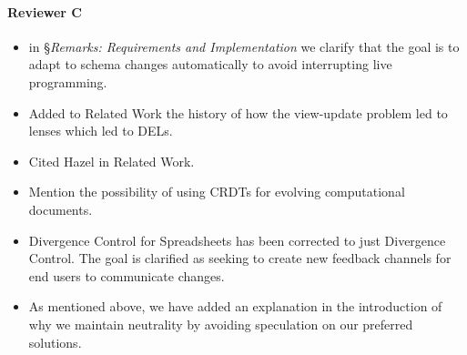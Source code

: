 \documentclass{article}
\begin{document}
\paragraph{Reviewer C}{}
\begin{itemize}
  \item in \S\emph{Remarks: Requirements and Implementation} we clarify that the goal is to adapt to schema changes automatically to avoid interrupting live programming.

  \item Added to Related Work the history of how the view-update problem led to lenses which led to DELs.

  \item Cited Hazel in Related Work.

  \item Mention the possibility of using CRDTs for evolving computational documents.

  \item Divergence Control for Spreadsheets has been corrected to just Divergence Control. The goal is clarified as seeking to create new feedback channels for end users to communicate changes.

  \item As mentioned above, we have added an explanation in the introduction of why we maintain neutrality by avoiding speculation on our preferred solutions.
\end{itemize}
\end{document}
